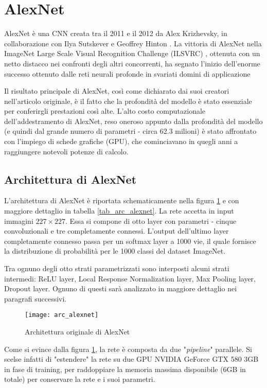 \section{AlexNet}\label{alexnet}
AlexNet è una CNN creata tra il 2011 e il 2012 da Alex Krizhevsky, in collaborazione con Ilya Sutskever e Geoffrey Hinton \cite{alexnet}. La vittoria di AlexNet nella ImageNet Large Scale Visual Recognition Challenge (ILSVRC) \cite{imagenet}, ottenuta con un netto distacco nei confronti degli altri concorrenti, ha segnato l'inizio dell'enorme successo ottenuto dalle reti neurali profonde in svariati domini di applicazione \cite{historydl}

Il risultato principale di AlexNet, così come dichiarato dai suoi creatori nell'articolo originale, è il fatto che la profondità del modello è stato essenziale per conferirgli prestazioni così alte. L'alto costo computazionale dell'addestramento di AlexNet, reso oneroso appunto dalla profondità del modello (e quindi dal grande numero di parametri - circa 62.3 milioni) è stato affrontato con l'impiego di schede grafiche (GPU), che cominciavano in quegli anni a raggiungere notevoli potenze di calcolo.

\subsection{Architettura di AlexNet}
L'architettura di AlexNet è riportata schematicamente nella figura \ref{arc_alexnet} e con maggiore dettaglio in tabella \ref{tab_arc_alexnet}.
La rete accetta in input immagini $227\times 227$. Essa si compone di otto layer con parametri - cinque convoluzionali e tre completamente connessi. L'output dell'ultimo layer completamente connesso passa per un softmax layer a 1000 vie, il quale fornisce la distribuzione di probabilità per le 1000 classi del dataset ImageNet.

Tra ognuno degli otto strati parametrizzati sono interposti alcuni strati intermedi: ReLU layer, Local Response Normalization layer, Max Pooling layer, Dropout layer. Ognuno di questi sarà analizzato in maggiore dettaglio nei paragrafi successivi.

\begin{figure}[h]
\centering
\texttt{[image: arc\_alexnet]}
\caption{Architettura originale di AlexNet \cite{alexnet}}
\label{arc_alexnet}
\end{figure}

Come si evince dalla figura \ref{arc_alexnet}, la rete è composta da due "\textit{pipeline}" parallele. Si scelse infatti di "estendere" la rete su due GPU NVIDIA\textsuperscript{\textregistered} GeForce\textsuperscript{\textregistered} GTX 580 3GB in fase di training, per raddoppiare la memoria massima disponibile (6GB in totale) per conservare la rete e i suoi parametri.

